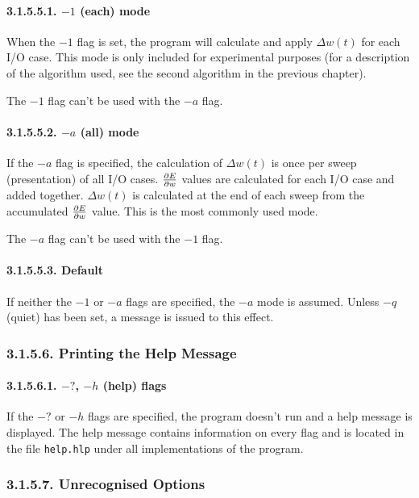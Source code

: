 \documentclass[12pt]{report}
\begin{document}
\paragraph{3.1.5.5.1. $-1$ (each) mode}

When the $-1$ flag is set, the program will calculate and apply
$\Delta w(t)$ for each I/O case.
This mode is only included for experimental purposes (for a
description of the algorithm used, see the second algorithm in the
previous chapter).

The $-1$ flag can't be used with the $-a$ flag.

\paragraph{3.1.5.5.2. $-a$ (all) mode}

If the $-a$ flag is specified, the calculation of $\Delta w(t)$ is
once per sweep (presentation) of all I/O cases.
$\partial E \over \partial w$ values are calculated for each I/O
case and added together.
$\Delta w(t)$ is calculated at the end of each sweep from the
accumulated $\partial E \over \partial w$ value.
This is the most commonly used mode.

The $-a$ flag can't be used with the $-1$ flag.

\paragraph{3.1.5.5.3. Default}

If neither the $-1$ or $-a$ flags are specified, the $-a$ mode is
assumed.
Unless $-q$ (quiet) has been set, a message is issued to this
effect.

\subsubsection{3.1.5.6. Printing the Help Message}

\paragraph{3.1.5.6.1. $-?$, $-h$ (help) flags}

If the $-?$ or $-h$ flags are specified, the program doesn't run and
a help message is displayed.
The help message contains information on every flag and is located
in the file \texttt{help.hlp} under all implementations of the program.

\subsubsection{3.1.5.7. Unrecognised Options}
\end{document}
